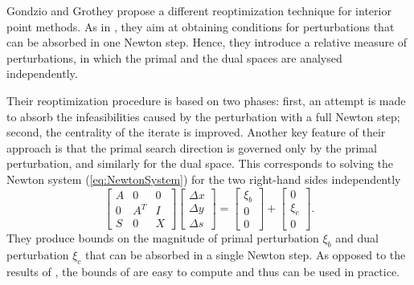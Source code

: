 Gondzio and Grothey \cite{GondzioGrothey03} propose a different 
reoptimization technique for interior point methods.
As in \cite{YildirimWright}, they aim at obtaining conditions for 
perturbations that can be absorbed in one Newton step.
Hence, they introduce a relative measure of perturbations, in which 
the primal and the dual spaces are analysed independently.


Their reoptimization procedure is based on two phases: first, an attempt 
is made to absorb the infeasibilities caused by the perturbation with a full 
Newton step; second, the centrality of the iterate is improved.
Another key feature of their approach is that the primal search 
direction is governed only by the primal perturbation, and similarly 
for the dual space. This corresponds to solving the Newton system 
(\ref{eq:NewtonSystem}) for the two right-hand sides independently
%
\[
\left[ \begin{array}{ccc}
    A & 0 & 0 \\ 0 &A^T & I \\ S & 0 & X
  \end{array} \right]
\left[ \begin{array}{c}
    \Delta x \\ \Delta y \\ \Delta s
  \end{array} \right] = 
\left[ \begin{array}{c}
    \xi_b \\ 0 \\ 0
  \end{array} \right] +
\left[ \begin{array}{c}
    0 \\ \xi_c \\ 0
  \end{array} \right].
\]
%
They produce bounds on the magnitude of primal perturbation $\xi_b$ 
and dual perturbation $\xi_c$ that can be absorbed in a single 
Newton step. As opposed to the results of \cite{YildirimWright}, 
the bounds of \cite{GondzioGrothey03} are easy to compute and 
thus can be used in practice.

